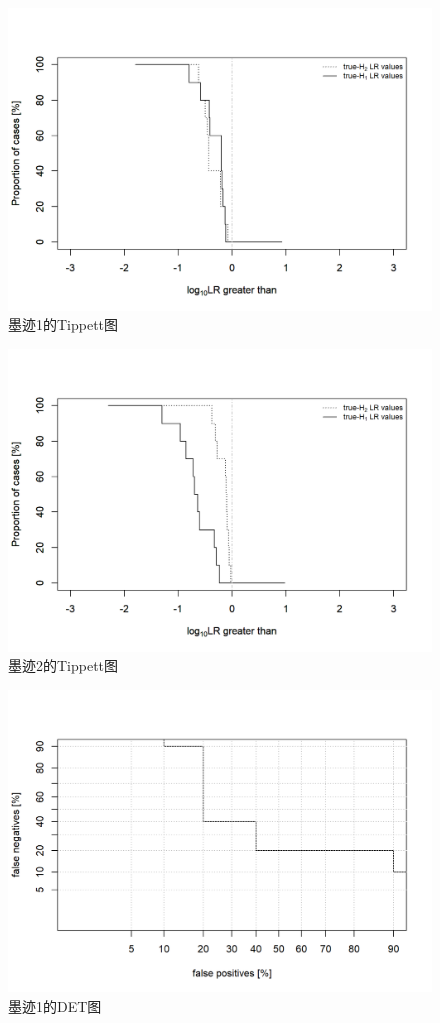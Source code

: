 \documentclass[12pt,a4paper]{article}
\begin{document}
    \begin{figure}[H]
        \centering
        \includegraphics[scale=0.8]{InkTippett1.png}
        \caption*{墨迹1的Tippett图}
    \end{figure}
    \begin{figure}[H]
        \centering
        \includegraphics[scale=0.8]{InkTippett2.png}
        \caption*{墨迹2的Tippett图}
    \end{figure}
    \begin{figure}[H]
        \centering
        \includegraphics[scale=0.8]{InkDET1.png}
        \caption*{墨迹1的DET图}
    \end{figure}
\end{document}
